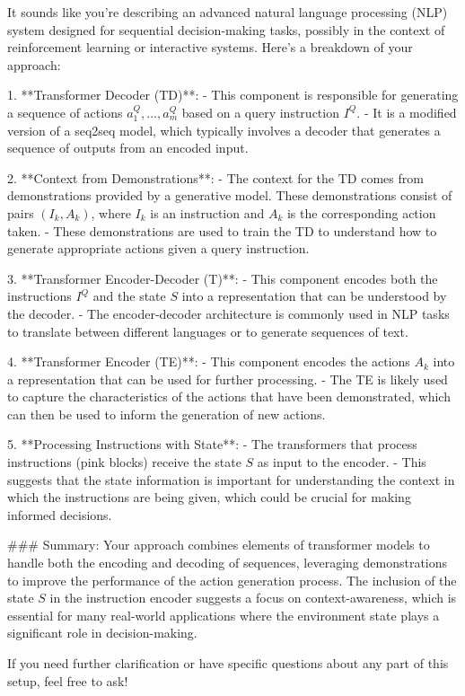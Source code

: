 It sounds like you're describing an advanced natural language processing (NLP) system designed for sequential decision-making tasks, possibly in the context of reinforcement learning or interactive systems. Here's a breakdown of your approach:

1. **Transformer Decoder (TD)**:
   - This component is responsible for generating a sequence of actions \(a^Q_1, \ldots, a^Q_m\) based on a query instruction \(I^Q\).
   - It is a modified version of a seq2seq model, which typically involves a decoder that generates a sequence of outputs from an encoded input.

2. **Context from Demonstrations**:
   - The context for the TD comes from demonstrations provided by a generative model. These demonstrations consist of pairs \((I_k, A_k)\), where \(I_k\) is an instruction and \(A_k\) is the corresponding action taken.
   - These demonstrations are used to train the TD to understand how to generate appropriate actions given a query instruction.

3. **Transformer Encoder-Decoder (T)**:
   - This component encodes both the instructions \(I^Q\) and the state \(S\) into a representation that can be understood by the decoder.
   - The encoder-decoder architecture is commonly used in NLP tasks to translate between different languages or to generate sequences of text.

4. **Transformer Encoder (TE)**:
   - This component encodes the actions \(A_k\) into a representation that can be used for further processing.
   - The TE is likely used to capture the characteristics of the actions that have been demonstrated, which can then be used to inform the generation of new actions.

5. **Processing Instructions with State**:
   - The transformers that process instructions (pink blocks) receive the state \(S\) as input to the encoder.
   - This suggests that the state information is important for understanding the context in which the instructions are being given, which could be crucial for making informed decisions.

### Summary:
Your approach combines elements of transformer models to handle both the encoding and decoding of sequences, leveraging demonstrations to improve the performance of the action generation process. The inclusion of the state \(S\) in the instruction encoder suggests a focus on context-awareness, which is essential for many real-world applications where the environment state plays a significant role in decision-making.

If you need further clarification or have specific questions about any part of this setup, feel free to ask!